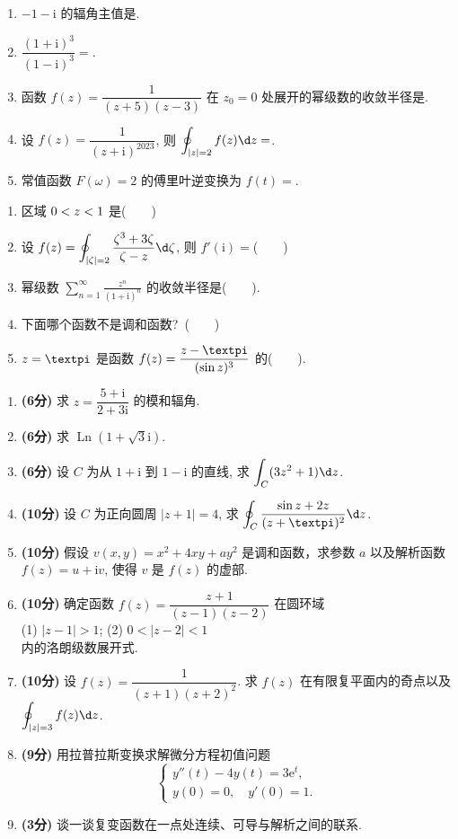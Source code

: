 \documentclass[simple]{hfutexam}
\DeclareMathOperator{\Ln}{Ln}
\let\Re\relax\DeclareMathOperator{\Re}{Re}
\newcommand{\ii}{\mathrm{i}}
\newcommand{\ee}{\mathrm{e}}
\newcommand{\cpi}{{\text{\textpi}}}
\newcommand{\dint}{\displaystyle\int}
\newcommand{\doint}{\displaystyle\oint}
\newcommand{\sumf}[1]{\displaystyle\sum_{n=#1}^{\infty}}
\begin{document}
\begin{enumerate}
  \item $-1-\ii$ 的辐角主值是\fillblank{}.
  \item $\dfrac{(1+\ii)^3}{(1-\ii)^3}=$\fillblank{}.
  \item 函数 $f(z)=\dfrac1{(z+5)(z-3)}$ 在 $z_0=0$ 处展开的幂级数的收敛半径是\fillblank{}.
  \item 设 $f(z)=\dfrac1{(z+\ii)^{2023}}$, 则 $\doint_{|z|=2}f(z)\d z=$\fillblank{}.
  \item 常值函数 $F(\omega)=2$ 的傅里叶逆变换为 $f(t)=$\fillblank{}.
\end{enumerate}

\begin{enumerate}
  \item 区域 $0<\Re z<1$ 是(~~~~)
  \item 设 $f(z)=\doint_{|\zeta|=2}\dfrac{\zeta^3+3\zeta}{\zeta-z}\d\zeta$, 则 $f'(\ii)=$(~~~~)
  \xx{$0$}{$3\ii$}{$-3\ii$}{$2\ii $}
  \item 幂级数 $\sumf1 \frac{z^n}{(1+\ii)^n}$ 的收敛半径是(~~~~).
  \item 下面哪个函数不是调和函数?~(~~~~)
  \item $z=\cpi$ 是函数 $f(z)=\dfrac{z-\cpi}{(\sin z)^3}$ 的(~~~~).
\end{enumerate}


\begin{enumerate}
  \item \textbf{(6分)} 求 $z=\dfrac{5+\ii}{2+3\ii}$ 的模和辐角.
  \item \textbf{(6分)} 求 $\Ln(1+\sqrt3\ii)$.
  \item \textbf{(6分)} 设 $C$ 为从 $1+\ii$ 到 $1-\ii$ 的直线, 求 $\dint_C (3z^2+1) \d z$.
  \item \textbf{(10分)} 设 $C$ 为正向圆周 $|z+1|=4$, 求 $\doint_C\frac{\sin z+2z}{(z+\cpi)^2}\d z$.
  \item \textbf{(10分)} 假设 $v(x,y)=x^2+4xy+ay^2$ 是调和函数，求参数 $a$ 以及解析函数 $f(z)=u+\ii v$, 使得 $v$ 是 $f(z)$ 的虚部.
  \item \textbf{(10分)} 确定函数 $f(z)=\dfrac{z+1}{(z-1)(z-2)}$ 在圆环域\\
\indent (1) $|z-1|>1$; \hspace{2em} (2) $0<|z-2|<1$\\
内的洛朗级数展开式.
  \item \textbf{(10分)} 设 $f(z)=\dfrac{1}{(z+1)(z+2)^2}$. 求 $f(z)$ 在有限复平面内的奇点以及 $\doint_{|z|=3}f(z)\d z$.
  \item \textbf{(9分)} 用拉普拉斯变换求解微分方程初值问题
\[\begin{cases}
y''(t)-4y(t)=3\ee^t,\\
y(0)=0,\quad y'(0)=1.
\end{cases}\]
  \item \textbf{(3分)} 谈一谈复变函数在一点处连续、可导与解析之间的联系.
\end{enumerate}
\end{document}
